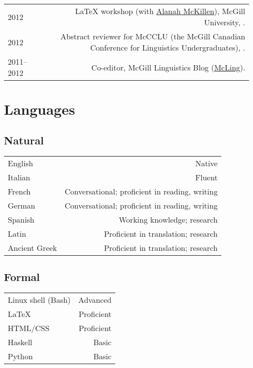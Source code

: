 \documentclass{article}
\makeatletter
\newcommand{\formatdatenoday}[2]{\mydatenoday\formatdate{0}{#1}{#2}}
\newcommand{\myvrule}{\color{lightgray}\vrule width 1.0pt}
\newenvironment{cvsection}{%
  \renewcommand{\arraystretch}{1.75}
  \begin{longtable}[l]{@{} L R @{}}
}{%
  \end{longtable}
}
\makeatother
\begin{document}
\begin{cvsection}
  2012 & \LaTeX{} workshop (with
  \href{http://people.linguistics.mcgill.ca/~alanah.mckillen/}{Alanah
  McKillen}), McGill University, . \\

  2012 & Abstract reviewer for McCCLU (the McGill Canadian Conference for
  Linguistics Undergraduates), \formatdatenoday{1}{2012}. \\


  2011--2012 & Co-editor, McGill Linguistics Blog
  (\href{https://blogs.mcgill.ca/mcling/}{McLing}). \\
\end{cvsection}

\section*{Languages}

\vspace{1ex}
\subsection*{Natural}

\begin{cvsection}
  English & Native \\
  Italian & Fluent \\
  French & Conversational; proficient in reading, writing \\
  German & Conversational; proficient in reading, writing \\
  Spanish & Working knowledge; research \\
  Latin & Proficient in translation; research \\
  Ancient Greek & Proficient in translation; research \\
\end{cvsection}

\vspace{-2ex}
\subsection*{Formal}

\begin{cvsection}
  Linux shell {\footnotesize (Bash)} & Advanced \\
  \LaTeX{} & Proficient \\
  HTML/CSS & Proficient \\
  Haskell & Basic \\
  Python & Basic \\
\end{cvsection}
\end{document}
